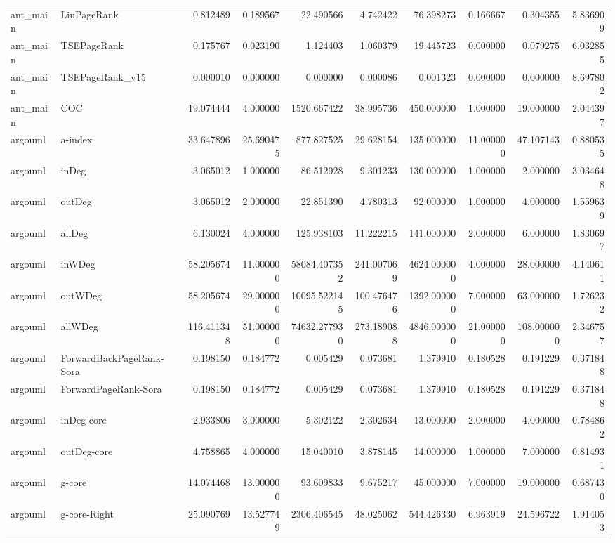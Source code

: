 \begin{tabular}{llrrrrrrrr}
ant_main & LiuPageRank & 0.812489 & 0.189567 & 22.490566 & 4.742422 & 76.398273 & 0.166667 & 0.304355 & 5.836909 \\
ant_main & TSEPageRank & 0.175767 & 0.023190 & 1.124403 & 1.060379 & 19.445723 & 0.000000 & 0.079275 & 6.032855 \\
ant_main & TSEPageRank_v15 & 0.000010 & 0.000000 & 0.000000 & 0.000086 & 0.001323 & 0.000000 & 0.000000 & 8.697802 \\
ant_main & COC & 19.074444 & 4.000000 & 1520.667422 & 38.995736 & 450.000000 & 1.000000 & 19.000000 & 2.044397 \\
argouml & a-index & 33.647896 & 25.690475 & 877.827525 & 29.628154 & 135.000000 & 11.000000 & 47.107143 & 0.880535 \\
argouml & inDeg & 3.065012 & 1.000000 & 86.512928 & 9.301233 & 130.000000 & 1.000000 & 2.000000 & 3.034648 \\
argouml & outDeg & 3.065012 & 2.000000 & 22.851390 & 4.780313 & 92.000000 & 1.000000 & 4.000000 & 1.559639 \\
argouml & allDeg & 6.130024 & 4.000000 & 125.938103 & 11.222215 & 141.000000 & 2.000000 & 6.000000 & 1.830697 \\
argouml & inWDeg & 58.205674 & 11.000000 & 58084.407352 & 241.007069 & 4624.000000 & 4.000000 & 28.000000 & 4.140611 \\
argouml & outWDeg & 58.205674 & 29.000000 & 10095.522145 & 100.476476 & 1392.000000 & 7.000000 & 63.000000 & 1.726232 \\
argouml & allWDeg & 116.411348 & 51.000000 & 74632.277930 & 273.189088 & 4846.000000 & 21.000000 & 108.000000 & 2.346757 \\
argouml & ForwardBackPageRank-Sora & 0.198150 & 0.184772 & 0.005429 & 0.073681 & 1.379910 & 0.180528 & 0.191229 & 0.371848 \\
argouml & ForwardPageRank-Sora & 0.198150 & 0.184772 & 0.005429 & 0.073681 & 1.379910 & 0.180528 & 0.191229 & 0.371848 \\
argouml & inDeg-core & 2.933806 & 3.000000 & 5.302122 & 2.302634 & 13.000000 & 2.000000 & 4.000000 & 0.784862 \\
argouml & outDeg-core & 4.758865 & 4.000000 & 15.040010 & 3.878145 & 14.000000 & 1.000000 & 7.000000 & 0.814931 \\
argouml & g-core & 14.074468 & 13.000000 & 93.609833 & 9.675217 & 45.000000 & 7.000000 & 19.000000 & 0.687430 \\
argouml & g-core-Right & 25.090769 & 13.527749 & 2306.406545 & 48.025062 & 544.426330 & 6.963919 & 24.596722 & 1.914053 \\

\end{tabular}
